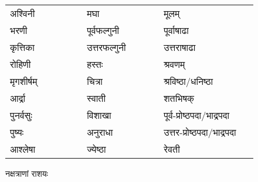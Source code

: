 {\normalsize
\begin{tabular}{p{0.27\linewidth}p{0.27\linewidth}p{0.33\linewidth}}
  अश्विनी  & मघा       & मूलम्                   \\
  भरणी    & पूर्वफल्गुनी  & पूर्वाषाढा              \\
  कृत्तिका  & उत्तरफल्गुनी & उत्तराषाढा             \\
  रोहिणी  & हस्तः      & श्रवणम्                 \\
  मृगशीर्षम् & चित्रा     & श्रविष्ठा/धनिष्ठा        \\
  आर्द्रा   & स्वाती     & शतभिषक्                \\
  पुनर्वसुः  & विशाखा    & पूर्व-प्रोष्ठपदा/भाद्रपदा  \\
  पुष्यः    & अनुराधा    & उत्तर-प्रोष्ठपदा/भाद्रपदा \\
  आश्लेषा   & ज्येष्ठा     & रेवती                  \\
\end{tabular}

}
\clearpage
नक्षत्राणां राशयः


